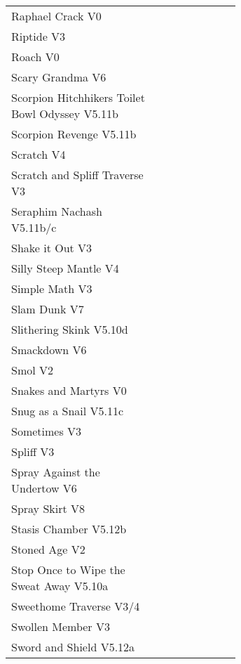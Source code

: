 \begin{flushleft}
\begin{center}
\begin{supertabular}{p{0.65\linewidth}r}
Raphael Crack V0 & \pageref{rt:Raphael Crack} \\
Riptide V3 & \pageref{rt:Riptide} \\
Roach V0 & \pageref{rt:Roach} \\
Scary Grandma V6 & \pageref{rt:Scary Grandma} \\
Scorpion Hitchhikers Toilet Bowl Odyssey V5.11b & \pageref{rt:Scorpion Hitchhikers Toilet Bowl Odyssey} \\
Scorpion Revenge V5.11b & \pageref{rt:Scorpion Revenge} \\
Scratch V4 & \pageref{rt:Scratch} \\
Scratch and Spliff Traverse V3 & \pageref{rt:Scratch and Spliff Traverse} \\
Seraphim Nachash V5.11b/c & \pageref{rt:Seraphim Nachash} \\
Shake it Out V3 & \pageref{vr:Shake it Out} \\
Silly Steep Mantle V4 & \pageref{rt:Silly Steep Mantle} \\
Simple Math V3 & \pageref{rt:Simple Math} \\
Slam Dunk V7 & \pageref{rt:Slam Dunk} \\
Slithering Skink V5.10d & \pageref{rt:Slithering Skink} \\
Smackdown V6 & \pageref{rt:Smackdown} \\
Smol V2 & \pageref{rt:Smol} \\
Snakes and Martyrs V0 & \pageref{rt:Snakes and Martyrs} \\
Snug as a Snail V5.11c & \pageref{rt:Snug as a Snail} \\
Sometimes V3 & \pageref{rt:Sometimes} \\
Spliff V3 & \pageref{rt:Spliff} \\
Spray Against the Undertow V6 & \pageref{vr:Spray Against the Undertow} \\
Spray Skirt V8 & \pageref{rt:Spray Skirt} \\
Stasis Chamber V5.12b & \pageref{rt:Stasis Chamber} \\
Stoned Age V2 & \pageref{rt:Stoned Age} \\
Stop Once to Wipe the Sweat Away V5.10a & \pageref{rt:Stop Once to Wipe the Sweat Away} \\
Sweethome Traverse V3/4 & \pageref{vr:Sweethome Traverse} \\
Swollen Member V3 & \pageref{rt:Swollen Member} \\
Sword and Shield V5.12a & \pageref{rt:Sword and Shield} \\

\end{supertabular}
\end{center}
\end{flushleft}
